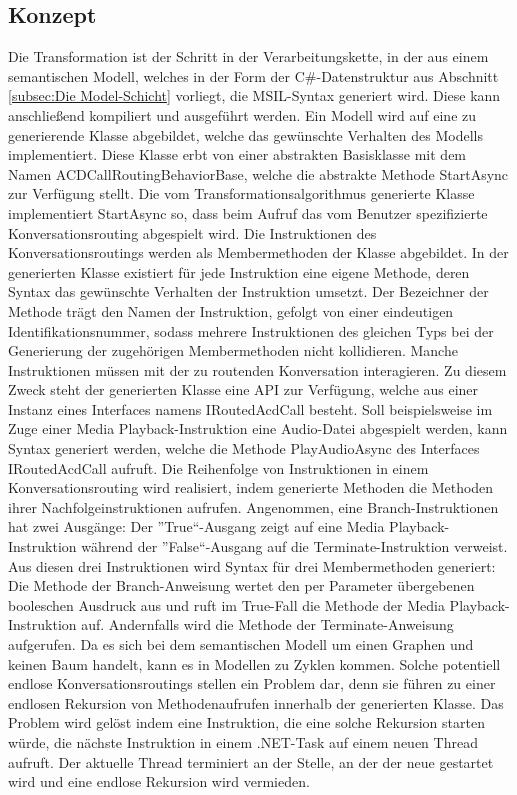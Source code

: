 \subsection{Konzept}
Die Transformation ist der Schritt in der Verarbeitungskette, in der aus einem semantischen Modell, welches in der Form der C\#-Datenstruktur aus Abschnitt \ref{subsec:Die Model-Schicht} vorliegt, die MSIL-Syntax generiert wird. Diese kann anschließend kompiliert und ausgeführt werden. Ein Modell wird auf eine zu generierende Klasse abgebildet, welche das gewünschte Verhalten des Modells implementiert. Diese Klasse erbt von einer abstrakten Basisklasse mit dem Namen ACDCallRoutingBehaviorBase, welche die abstrakte Methode StartAsync zur Verfügung stellt. Die vom Transformationsalgorithmus generierte Klasse implementiert StartAsync so, dass beim Aufruf das vom Benutzer spezifizierte Konversationsrouting abgespielt wird.
\newline 
Die Instruktionen des Konversationsroutings werden als Membermethoden der Klasse abgebildet. In der generierten Klasse existiert für jede Instruktion eine eigene Methode, deren Syntax das gewünschte Verhalten der Instruktion umsetzt. Der Bezeichner der Methode trägt den Namen der Instruktion, gefolgt von einer eindeutigen Identifikationsnummer, sodass mehrere Instruktionen des gleichen Typs bei der Generierung der zugehörigen Membermethoden nicht kollidieren. Manche Instruktionen müssen mit der zu routenden Konversation interagieren. Zu diesem Zweck steht der generierten Klasse eine API zur Verfügung, welche aus einer Instanz eines Interfaces namens IRoutedAcdCall besteht. Soll beispielsweise im Zuge einer Media Playback-Instruktion eine Audio-Datei abgespielt werden, kann Syntax generiert werden, welche die Methode PlayAudioAsync des Interfaces IRoutedAcdCall aufruft. 
\newline
Die Reihenfolge von Instruktionen in einem Konversationsrouting wird realisiert, indem generierte Methoden die Methoden ihrer Nachfolgeinstruktionen aufrufen. Angenommen, eine Branch-Instruktionen hat zwei Ausgänge: Der ''True``-Ausgang zeigt auf eine Media Playback-Instruktion während der ''False``-Ausgang auf die Terminate-Instruktion verweist. Aus diesen drei Instruktionen wird Syntax für drei Membermethoden generiert: Die Methode der Branch-Anweisung wertet den per Parameter übergebenen booleschen Ausdruck aus und ruft im True-Fall die Methode der Media Playback-Instruktion auf. Andernfalls wird die Methode der Terminate-Anweisung aufgerufen. Da es sich bei dem semantischen Modell um einen Graphen und keinen Baum handelt, kann es in Modellen zu Zyklen kommen. Solche potentiell endlose Konversationsroutings stellen ein Problem dar, denn sie führen zu einer endlosen Rekursion von Methodenaufrufen innerhalb der generierten Klasse. Das Problem wird gelöst indem eine Instruktion, die eine solche Rekursion starten würde, die nächste Instruktion in einem .NET-Task auf einem neuen Thread aufruft. Der aktuelle  Thread terminiert an der Stelle, an der der neue gestartet wird und eine endlose Rekursion wird vermieden.
